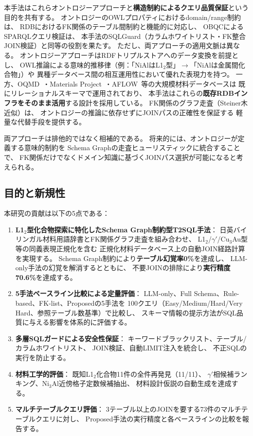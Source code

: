 \documentclass[5p,twocolumn]{elsarticle}
\begin{document}
本手法はこれらオントロジーアプローチと\textbf{構造制約によるクエリ品質保証}という
目的を共有する。
オントロジーのOWLプロパティにおけるdomain/range制約は、
RDBにおけるFK関係のテーブル間制約と機能的に対応し、
OBQCによるSPARQLクエリ検証は、
本手法のSQLGuard（カラムホワイトリスト・FK整合JOIN検証）と同等の役割を果たす。
ただし、両アプローチの適用文脈は異なる。
オントロジーアプローチはRDFトリプルストアへのデータ変換を前提とし、
OWL推論による意味的推移律（例：「NiAlはL1$_2$型」$\to$「NiAlは金属間化合物」）や
異種データベース間の相互運用性において優れた表現力を持つ。
一方、OQMD~\citep{saal2013oqmd}・Materials Project~\citep{jain2013mp}・AFLOW~\citep{curtarolo2012aflow}等の大規模材料データベースは
既にリレーショナルスキーマで運用されており、
本手法はこれらの\textbf{既存RDBインフラをそのまま活用}する設計を採用している。
FK関係のグラフ走査（Steiner木近似）は、
オントロジーの推論に依存せずにJOINパスの正確性を保証する
軽量な代替手段を提供する。

両アプローチは排他的ではなく相補的である。
将来的には、オントロジーが定義する意味的制約を
Schema Graphの走査ヒューリスティックに統合することで、
FK関係だけでなくドメイン知識に基づくJOINパス選択が可能になると考えられる。

\subsection{目的と新規性}

本研究の貢献は以下の5点である：

\begin{enumerate}
  \item \textbf{L1$_2$型化合物探索に特化したSchema Graph制約型T2SQL手法}：
    日英バイリンガル材料用語辞書とFK関係グラフ走査を組み合わせ、
    L1$_2$/$\gamma'$/Cu$_3$Au型等の同義表現正規化を含む
    正規化材料データベース上の自動JOIN経路計算を実現する。
    Schema Graph制約により\textbf{テーブル幻覚率0\%}を達成し、
    LLM-only手法の幻覚を解消するとともに、
    不要JOINの排除により\textbf{実行精度70.6\%}を達成する。
  \item \textbf{5手法ベースライン比較による定量評価}：
    LLM-only、Full Schema、Rule-based、FK-list、Proposedの5手法を
    100クエリ（Easy/Medium/Hard/Very Hard、参照テーブル数基準）で比較し、
    スキーマ情報の提示方法がSQL品質に与える影響を体系的に評価する。
  \item \textbf{多層SQLガードによる安全性保証}：
    キーワードブラックリスト、テーブル/カラムホワイトリスト、
    JOIN検証、自動LIMIT注入を統合し、
    不正SQLの実行を防止する。
  \item \textbf{材料工学的評価}：
    既知L1$_2$化合物11件の全件再発見（11/11）、
    $\gamma'$相候補ランキング、Ni$_3$Al近傍格子定数候補抽出、
    材料設計仮説の自動生成を達成する。
  \item \textbf{マルチテーブルクエリ評価}：
    3テーブル以上のJOINを要する73件のマルチテーブルクエリに対し、
    Proposed手法の実行精度と各ベースラインの比較を報告する。
\end{enumerate}
\end{document}
